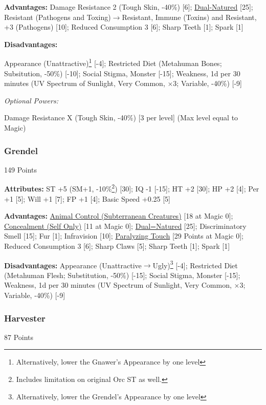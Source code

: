 \begin{multicols*}{3}
	\textbf{Advantages:}
	Damage Resistance 2 (Tough Skin, -40\%) [6]; \hyperref[dual_natured]{Dual-Natured} [25]; Resistant (Pathogens and Toxing)$\rightarrow$Resistant, Immune (Toxins)  and Resistant, +3 (Pathogens) [10]; Reduced Consumption 3 [6]; Sharp Teeth [1]; Spark [1]
	
	\textbf{Disadvantages:}
	
	Appearance (Unattractive)\footnote{Alternatively, lower the Gnawer's Appearance by one level} [-4]; Restricted Diet (Metahuman Bones; Subsitution, -50\%) [-10]; Social Stigma, Monster [-15]; Weakness, 1d per 30 minutes (UV Spectrum of Sunlight, Very Common, $\times$3; Variable, -40\%) [-9]
	
	\textit{Optional Powers:}
	
	Damage Resistance X (Tough Skin, -40\%) [3 per level] (Max level equal to Magic)
	
	\subsubsection{Grendel}\label{grendel}
	\begin{flushright}
		149 Points
	\end{flushright}
	
	\textbf{Attributes:}
	ST +5 (SM+1, -10\%\footnote{Includes limitation on original Orc ST as well.}) [30]; IQ -1 [-15]; HT +2 [30]; HP +2 [4]; Per +1 [5]; Will +1 [7]; FP +1 [4]; Basic Speed +0.25 [5]
	
	\textbf{Advantages:}
	\hyperref[animal_control]{Animal Control (Subterranean Creatures)} [18 at Magic 0]; \hyperref[concealment_self_only]{Concealment (Self Only)} [11 at Magic 0]; \hyperref[dual_natured]{Dual=Natured} [25]; Discriminatory Smell [15]; Fur [1]; Infravision [10]; \hyperref[paralyzing_touch]{Paralyzing Touch} [29 Points at Magic 0]; Reduced Consumption 3 [6]; Sharp Claws [5]; Sharp Teeth [1]; Spark [1]
	
	\textbf{Disadvantages:}
	Appearance (Unattractive$\rightarrow$Ugly)\footnote{Alternatively, lower the Grendel's Appearance by one level} [-4]; Restricted Diet (Metahuman Flesh; Substitution, -50\%) [-15]; Social Stigma, Monster [-15]; Weakness, 1d per 30 minutes (UV Spectrum of Sunlight, Very Common, $\times$3; Variable, -40\%) [-9]	
	
	\subsubsection{Harvester}\label{harvester}
	\begin{flushright}
		87 Points
	\end{flushright}
	

\end{multicols*}
